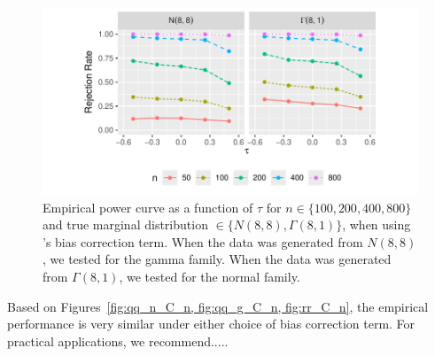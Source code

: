 \documentclass[12pt]{article}
\begin{document}
\begin{figure}[tbp]
  \centering
  \includegraphics[scale=1]{figures/rr_C_n}
  \caption{Empirical power curve as a function of $\tau$ for
    $n \in \{100, 200, 400, 800\}$ and true marginal distribution
    $\in \{N(8,8), \Gamma(8,1)\}$, when using \citet{babu2004goodness}'s bias correction term. When the data was generated from $N(8,8)$,
    we tested for the gamma family. When the data was generated from
    $\Gamma(8,1)$, we tested for the normal family.
  }
  \label{fig:rr_C_n}
\end{figure}

Based on Figures~\ref{fig:qq_n_C_n, fig:qq_g_C_n, fig:rr_C_n}, the empirical performance is very similar under either choice of bias correction term. For practical applications, we recommend.....



\end{document}

